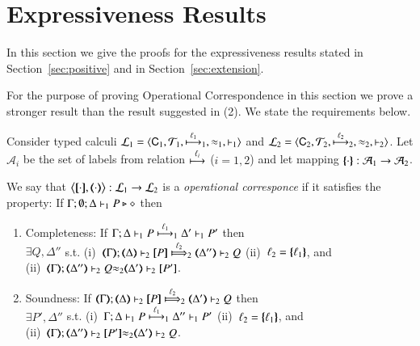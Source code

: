 \section{Expressiveness Results}

In this section we give the proofs for the expressiveness
results stated in Section~\ref{sec:positive}
and in Section~\ref{sec:extension}.

For the purpose of proving Operational Correspondence
in this section we prove a stronger result than the result
suggested in (2). We state the
requirements below.

\begin{definition}\rm
	\label{app:def:opc_strong}
	Consider typed calculi
	$\tyl{L}_1 = \calc{\CAL_1}{{\cal{T}}_1}{\hby{\ell_1}_1}{\wb_1}{\proves_1}$
	and $\tyl{L}_2=\calc{\CAL_2}{{\cal{T}}_2}{\hby{\ell_2}_2}{\wb_2}{\proves_2}$.
	Let $\mathcal{A}_i$ be the set of labels from relation $\hby{\ell_i}$
	($i=1,2$) and let mapping $\mapa{\cdot} : \mathcal{A}_1 \to \mathcal{A}_2$.

	We say that $\enco{\map{\cdot}, \mapt{\cdot}}: \tyl{L}_1 \to \tyl{L}_2$ is a
	\emph{operational corresponce}
	if it satisfies the property:
	If $\Gamma; \emptyset; \Delta \proves_1 P \hastype \Proc$ then
		\begin{enumerate}
			\item	Completeness:
				If  $\stytraargi{\Gamma}{\ell_1}{\Delta}{P}{\Delta'}{P'}{1}{1}$
				then\\
				$\exists Q, \Delta''$ s.t. 
				(i)~$\wtytraargi{\mapt{\Gamma}}{\ell_2}{\mapt{\Delta}}{\map{P}}{\mapt{\Delta''}}{Q}{2}{2}$
				(ii)~$\ell_2 = \mapa{\ell_1}$, 
				and \\
				(ii)~${\mapt{\Gamma}};{\mapt{\Delta''}}\proves_2 {Q}{\wb_2}{\mapt{\Delta'}}\proves_2 {\map{P'}}$.
				
			\item	Soundness:   
				If  $\wtytraargi{\mapt{\Gamma}}{\ell_2}{\mapt{\Delta}}{\map{P}}{\mapt{\Delta'}}{Q}{2}{2}$
				then \\ $\exists P', \Delta''$ s.t.  
				(i)~$\stytraargi{\Gamma}{\ell_1}{\Delta}{P}{\Delta''}{P'}{1}{1}$
				(ii)~$\ell_2 = \mapa{\ell_1}$, 
				and \\
				(ii)~${\mapt{\Gamma}};{\mapt{\Delta''}}\proves_2 {\map{P'}}{\wb_2}{\mapt{\Delta'}}\proves_2 {Q}$.
		\end{enumerate}
\end{definition}

